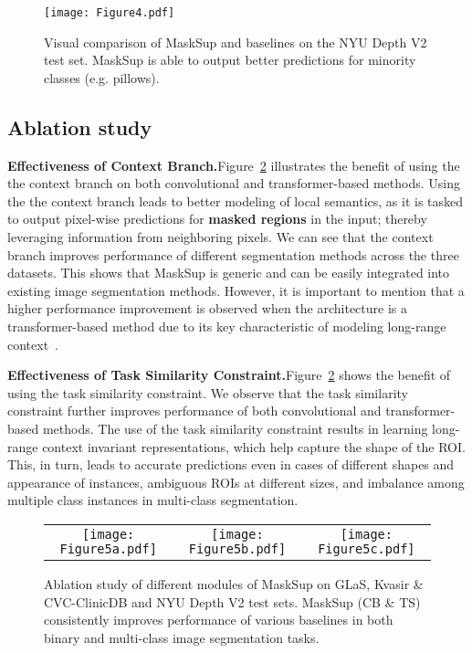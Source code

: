 \documentclass{bmvc2k}
\begin{document}
\begin{figure}[!htb]
\centering
\texttt{[image: Figure4.pdf]}
\caption{Visual comparison of MaskSup and baselines on the NYU Depth V2 test set. MaskSup is able to output better predictions for minority classes (e.g. pillows).}
\label{Fig:qual2}
\end{figure}

\subsection{Ablation study}
\noindent\textbf{Effectiveness of Context Branch.}\quad Figure~\ref{Fig:ablation} illustrates the benefit of using the the context branch on both convolutional and transformer-based methods. Using the the context branch leads to better modeling of local semantics, as it is tasked to output pixel-wise predictions for \textbf{masked regions} in the input; thereby leveraging information from neighboring pixels. We can see that the context branch improves performance of different segmentation methods across the three datasets. This shows that MaskSup is generic and can be easily integrated into existing image segmentation methods. However, it is important to mention that a higher performance improvement is observed when the architecture is a transformer-based method due to its key characteristic of modeling long-range context~\cite{dosovitskiy2020vit,xu2021levit}.

\medskip\noindent\textbf{Effectiveness of Task Similarity Constraint.}\quad Figure~\ref{Fig:ablation} shows the benefit of using the task similarity constraint. We observe that the task similarity constraint further improves performance of both convolutional and transformer-based methods. The use of the task similarity constraint results in learning long-range context invariant representations, which help capture the shape of the ROI. This, in turn, leads to accurate predictions even in cases of different shapes and appearance of instances, ambiguous ROIs at different sizes, and imbalance among multiple class instances in multi-class segmentation.

\begin{figure}[!htb]
\centering
\setlength{\tabcolsep}{5pt}
\begin{tabular}{ccc}
\texttt{[image: Figure5a.pdf]} & \texttt{[image: Figure5b.pdf]} & \texttt{[image: Figure5c.pdf]}
\end{tabular}
\caption{Ablation study of different modules of MaskSup on GLaS, Kvasir \& CVC-ClinicDB and NYU Depth V2 test sets. MaskSup (CB \& TS) consistently improves performance of various baselines in both binary and multi-class image segmentation tasks.}
\label{Fig:ablation}
\end{figure}
\end{document}
